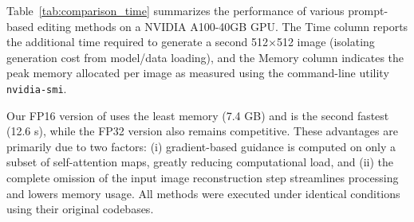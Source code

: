 


Table~\ref{tab:comparison_time} summarizes the performance of various prompt-based editing methods on a NVIDIA A100-40GB GPU. The Time column reports the additional time required to generate a second 512×512 image (isolating generation cost from model/data loading), and the Memory column indicates the peak memory allocated per image as measured using the command-line utility \texttt{nvidia-smi}.

Our FP16 version of \method{} uses the least memory (7.4 GB) and is the second fastest (12.6 s), while the FP32 version also remains competitive. These advantages are primarily due to two factors: (i) gradient-based guidance is computed on only a subset of self-attention maps, greatly reducing computational load, and (ii) the complete omission of the input image reconstruction step streamlines processing and lowers memory usage. All methods were executed under identical conditions using their original codebases.



